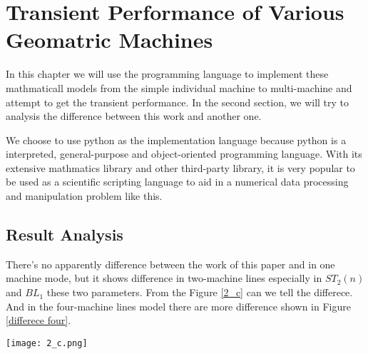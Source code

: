 \chapter{Transient Performance of Various Geomatric Machines}
\label{C_Kapitel}
\noindent In this chapter we will use the programming language to implement these mathmaticall models from the simple individual machine to multi-machine and attempt to get the transient performance. In the second section, we will try to analysis the difference between this work and another one. 

We choose to use python as the implementation language because python is a interpreted, general-purpose and object-oriented programming language. With its extensive mathmatics library and other third-party library, it is very popular to be used as a scientific scripting language to aid in a numerical data processing and manipulation problem like this.





\section{Result Analysis}
\noindent There's no apparently difference between the work of this paper and \cite{chen2015transient} in one machine mode, but it shows difference in two-machine lines especially in $ST_2(n)$ and $BL_1$ these two parameters. From the Figure \ref{2_c} can we tell the differece. And in the four-machine lines model there are more difference shown in Figure \ref{differece four}.




\begin{figure*}[!h]
	\centering
	\texttt{[image: 2\_c.png]}
	\caption{Performance contrast of a two-machine geometric line $ST_2(n) \ and\ BL_2(n)$}
	\label{2_c}
\end{figure*}

\begin{figure*}[!h]
	\centering
	\caption{Transients of a four-machine geometric line. (a) $PR(n) \ and\ CR(n)$;(b) $WIP(n)$; (c) $ST_i(n)$;(d) $BL_i(n)$.}
	\label{differece four}
\end{figure*}

